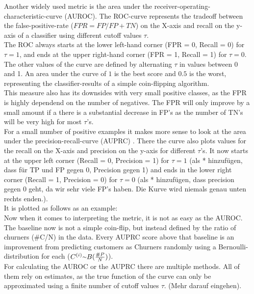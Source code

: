 \documentclass[12pt,titlepage]{article}
\begin{document}
Another widely used metric is the area under the receiver-operating-characteristic-curve (AUROC). The ROC-curve represents the tradeoff between the false-positive-rate ($FPR=FP/FP+TN$) on the X-axis and recall on the y-axis of a classifier using different cutoff values $\tau$. \\
The ROC always starts at the lower left-hand corner (FPR = 0, Recall = 0) for $\tau=1$, and ends at the upper right-hand corner (FPR = 1, Recall = 1) for $\tau=0$. The other values of the curve are defined by alternating $\tau$ in values between 0 and 1. An area under the curve of $1$ is the best score and $0.5$ is the worst, representing the classifier-results of a simple coin-flipping algorithm. \\
This measure also has its downsides with very small positive classes, as the FPR is highly dependend on the number of negatives. The FPR will only improve by a small amount if a there is a substantial decrease in FP's as the number of TN's will be very high for most $\tau$'s. \\
For a small number of positive examples it makes more sense to look at the area under the precision-recall-curve (AUPRC) \cite{auprc}. There the curve also plots values for the recall on the X-axis and precision on the y-axis for different $\tau$'s. It now starts at the upper left corner (Recall = 0, Precision = 1) for $\tau=1$ (als * hinzufügen, dass für TP und FP gegen 0, Precision gegen 1) and ends in the lower right corner (Recall = 1, Precision = 0) for $\tau=0$ (als * hinzufügen, dass precision gegen 0 geht, da wir sehr viele FP's haben. Die Kurve wird niemals genau unten rechts enden.). \\
It is plotted as follows as an example:\\
Now when it comes to interpreting the metric, it is not as easy as the AUROC. The baseline now is not a simple coin-flip, but instead defined by the ratio of churners (\#C/N) in the data. Every AUPRC score above that baseline is an improvement from predicting customers as Churners randomly using a Bernoulli-distribution for each ($C^{(i)}{\raise.17ex\hbox{$\scriptstyle\mathtt{\sim}$}} B(\frac{\#P}{N})$). \\
For calculating the AUROC or the AUPRC there are multiple methods. All of them rely on estimates, as the true function of the curve can only be approximated using a finite number of cutoff values $\tau$. (Mehr darauf eingehen). \\


\newpage

\thispagestyle{empty}

\printbibliography

\vspace*{6mm}
\end{document}
